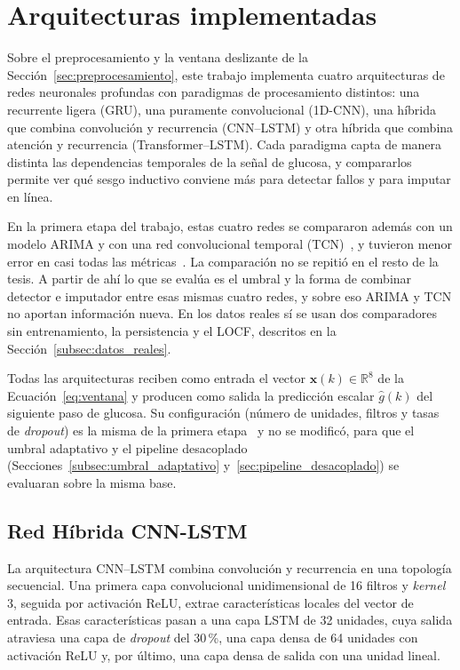 \documentclass{report}
\begin{document}
\section{Arquitecturas implementadas}
\label{sec:arquitecturas_implementadas}

Sobre el preprocesamiento y la ventana deslizante de la Sección~\ref{sec:preprocesamiento}, este trabajo implementa cuatro arquitecturas de redes neuronales profundas con paradigmas de procesamiento distintos: una recurrente ligera (GRU), una puramente convolucional (1D-CNN), una híbrida que combina convolución y recurrencia (CNN--LSTM) y otra híbrida que combina atención y recurrencia (Transformer--LSTM). Cada paradigma capta de manera distinta las dependencias temporales de la señal de glucosa, y compararlos permite ver qué sesgo inductivo conviene más para detectar fallos y para imputar en línea.

En la primera etapa del trabajo, estas cuatro redes se compararon además con un modelo ARIMA y con una red convolucional temporal (TCN)~\cite{samal2025autoTCN}, y tuvieron menor error en casi todas las métricas~\cite{sanchez2025imputation}. La comparación no se repitió en el resto de la tesis. A partir de ahí lo que se evalúa es el umbral y la forma de combinar detector e imputador entre esas mismas cuatro redes, y sobre eso ARIMA y TCN no aportan información nueva. En los datos reales sí se usan dos comparadores sin entrenamiento, la persistencia y el LOCF, descritos en la Sección~\ref{subsec:datos_reales}.

Todas las arquitecturas reciben como entrada el vector $\mathbf{x}(k) \in \mathbb{R}^{8}$ de la Ecuación~\eqref{eq:ventana} y producen como salida la predicción escalar $\hat{g}(k)$ del siguiente paso de glucosa. Su configuración (número de unidades, filtros y tasas de \textit{dropout}) es la misma de la primera etapa~\cite{sanchez2025imputation} y no se modificó, para que el umbral adaptativo y el pipeline desacoplado (Secciones~\ref{subsec:umbral_adaptativo} y~\ref{sec:pipeline_desacoplado}) se evaluaran sobre la misma base.


\subsection{Red Híbrida CNN-LSTM}
\label{subsec:arq_cnn_lstm}

La arquitectura CNN--LSTM combina convolución y recurrencia en una topología secuencial. Una primera capa convolucional unidimensional de 16 filtros y \textit{kernel} 3, seguida por activación ReLU, extrae características locales del vector de entrada. Esas características pasan a una capa LSTM de 32 unidades, cuya salida atraviesa una capa de \textit{dropout} del 30\,\%, una capa densa de 64 unidades con activación ReLU y, por último, una capa densa de salida con una unidad lineal.
\end{document}
